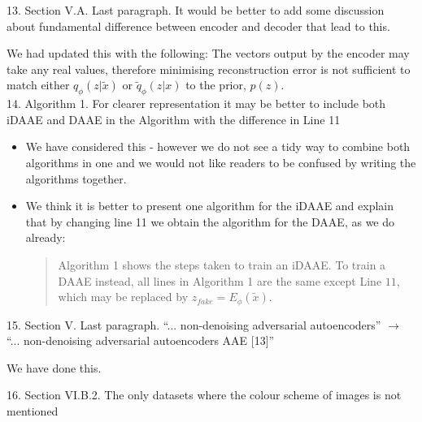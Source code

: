 \documentclass{article}
\begin{document}
{\color{blue}
13. Section V.A. Last paragraph. It would be better to add some discussion about fundamental difference between encoder and decoder that lead to this.}

{\color{red}
We had updated this with the following:
The vectors output by the encoder may take any real values, therefore minimising reconstruction error is not sufficient to match either $q_\phi(z|\tilde{x})$ or $\tilde{q}_\phi(z|x)$ to the prior, $p(z)$. 
}\\


{\color{blue}
14. Algorithm 1. For clearer representation it may be better to include both iDAAE and DAAE in the Algorithm with the difference in Line 11}

\begin{itemize}
    \item We have considered this - however we do not see a tidy way to combine both algorithms in one and we would not like readers to be confused by writing the algorithms together.
    \item We think it is better to present one algorithm for the iDAAE and explain that by changing line 11 we obtain the algorithm for the DAAE, as we do already:
    \begin{quote}
        Algorithm 1 shows the steps taken to train an iDAAE. To train a DAAE instead, all lines in Algorithm 1 are the same except Line $11$, which may be replaced by $z_{fake} = E_\phi(\tilde{x})$.
    \end{quote}
\end{itemize}

{\color{blue}
15. Section V. Last paragraph. ``... non-denoising adversarial autoencoders'' $\rightarrow$ ``... non-denoising adversarial autoencoders AAE [13]''} \newline

We have done this.

{\color{blue}
16. Section VI.B.2. The only datasets where the colour scheme of images is not mentioned} \newline
\end{document}
